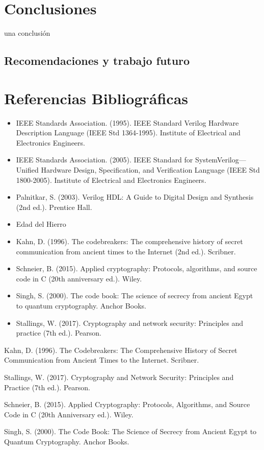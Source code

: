 
\chapter{Conclusiones}

una conclusi\'on

\section{Recomendaciones y trabajo futuro}

%
\chapter{Referencias Bibliográficas}
\begin{itemize}
\item IEEE Standards Association. (1995). IEEE Standard Verilog Hardware Description Language (IEEE Std 1364-1995). Institute of Electrical and Electronics Engineers.
\item IEEE Standards Association. (2005). IEEE Standard for SystemVerilog—Unified Hardware Design, Specification, and Verification Language (IEEE Std 1800-2005). Institute of Electrical and Electronics Engineers.
\item Palnitkar, S. (2003). Verilog HDL: A Guide to Digital Design and Synthesis (2nd ed.). Prentice Hall.
\item Edad del Hierro
\item Kahn, D. (1996). The codebreakers: The comprehensive history of secret communication from ancient times to the Internet (2nd ed.). Scribner.
\item Schneier, B. (2015). Applied cryptography: Protocols, algorithms, and source code in C (20th anniversary ed.). Wiley.
\item Singh, S. (2000). The code book: The science of secrecy from ancient Egypt to quantum cryptography. Anchor Books.
\item Stallings, W. (2017). Cryptography and network security: Principles and practice (7th ed.). Pearson.
\end{itemize}












Kahn, D. (1996). The Codebreakers: The Comprehensive History of Secret Communication from Ancient Times to the Internet. Scribner.

Stallings, W. (2017). Cryptography and Network Security: Principles and Practice (7th ed.). Pearson.

Schneier, B. (2015). Applied Cryptography: Protocols, Algorithms, and Source Code in C (20th Anniversary ed.). Wiley.

Singh, S. (2000). The Code Book: The Science of Secrecy from Ancient Egypt to Quantum Cryptography. Anchor Books.





\endinput 

